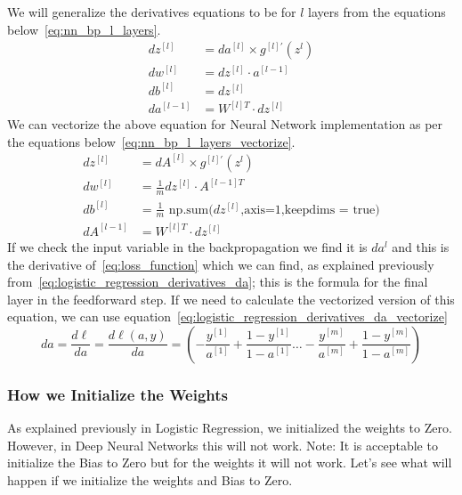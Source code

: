 We will generalize the derivatives equations to be for $l$ layers from the equations below~\eqref{eq:nn_bp_l_layers}.%
%
\begin{subequations}\label{eq:nn_bp_l_layers}
  \begin{align}
   dz^{[l]} & = da^{[l]} \times g^{[l]'}(z^{l}) \\
   dw^{[l]} & = dz^{[l]} \cdot a^{[l-1]} \\
   db^{[l]} & = dz^{[l]} \\
   da^{[l-1]} & = W^{[l]T} \cdot dz^{[l]} %
 \end{align}
\end{subequations}%
We can vectorize the above equation for Neural Network implementation as per the equations below~\eqref{eq:nn_bp_l_layers_vectorize}.
 \begin{subequations}\label{eq:nn_bp_l_layers_vectorize}
  \begin{align}
   dz^{[l]} & = dA^{[l]} \times g^{[l]'}(z^{l}) \\
   dw^{[l]} & = \frac{1}{m} dz^{[l]} \cdot A^{[l-1]T} \\
   db^{[l]} & = \frac{1}{m} \text{ np.sum(}dz^{[l]}\text{,axis=1,keepdims = true)} \\
   dA^{[l-1]} & = W^{[l]T} \cdot dz^{[l]} %
 \end{align}
\end{subequations}%
%
If we check the input variable in the backpropagation we find it is $da^{l}$ and this is the derivative of~\eqref{eq:loss_function} which we can find, as explained previously from~\eqref{eq:logistic_regression_derivatives_da}; this is the formula for the final layer in the feedforward step. If we need to calculate the vectorized version of this equation, we can use equation~\eqref{eq:logistic_regression_derivatives_da_vectorize}
\begin{equation}\label{eq:logistic_regression_derivatives_da_vectorize}
da = \frac{d\ell}{da} = \frac{d\ell(a,y)}{da} = (- \frac{y^{[1]}}{a^{[1]}} + \frac{1-y^{[1]}}{1-a^{[1]}} \ldots - \frac{y^{[m]}}{a^{[m]}} + \frac{1-y^{[m]}}{1-a^{[m]}} )
\end{equation}%
%
\subsubsection{How we Initialize the Weights}
As explained previously in Logistic Regression, we initialized the weights to Zero. However, in Deep Neural Networks this will not work. Note: It is acceptable to initialize the Bias to Zero but for the weights it will not work. Let's see what will happen if we initialize the weights and Bias to Zero. %
  
